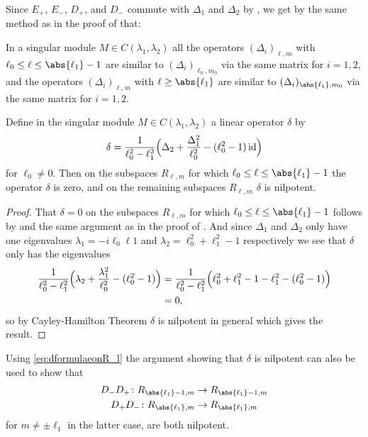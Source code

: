 Since $E_+$, $E_-$, $D_+$, and $D_-$ commute with $\Delta_1$ and $\Delta_2$ by , we get by the same method as in the proof of  that:

\begin{lemma}\label{lem:singmodDeltasimilar}
  In a singular module $M\in C(\lambda_1,\lambda_2)$ all the operators $(\Delta_i)_{\ell,m}$ with $\ell_0\leq \ell\leq \abs{\ell_1}-1$ are similar to $(\Delta_i)_{\ell_0,m_0}$ via the same matrix for $i=1,2$, and the operators $(\Delta_i)_{\ell,m}$ with $\ell\geq \abs{\ell_1}$ are similar to $(\Delta_i)_{\abs{\ell_1},m_0}$ via the same matrix for $i=1,2$.
\end{lemma}

\begin{lemma}\label{lem:Deltarelsing}
  Define in the singular module $M\in C(\lambda_1,\lambda_2)$ a linear operator $\delta$ by
  \begin{align}
    \delta = \dfrac{1}{\ell_0^2-\ell_1^2}\Bigl( \Delta_2 + \dfrac{\Delta_1^2}{\ell_0^2} - (\ell_0^2-1)\operatorname{id} \Bigr)
  \end{align}
  for $\ell_0\neq 0$. Then on the subspaces $R_{\ell,m}$ for which $\ell_0\leq \ell\leq \abs{\ell_1}-1$ the operator $\delta$ is zero, and on the remaining subspaces $R_{\ell,m}$ $\delta$ is nilpotent.
\end{lemma}
\begin{proof}
  That $\delta=0$ on the subspaces $R_{\ell,m}$ for which $\ell_0\leq \ell\leq \abs{\ell_1}-1$ follows by  and the same argument as in the proof of . And since $\Delta_1$ and $\Delta_2$ only have one eigenvalues $\lambda_1=-i\ell_0\ell1$ and $\lambda_2=\ell_0^2+\ell_1^2-1$ respectively we see that $\delta$ only has the eigenvalues
  \begin{align*}
    \dfrac{1}{\ell_0^2-\ell_1^2}\Bigl( \lambda_2 + \dfrac{\lambda_1^2}{\ell_0^2} - (\ell_0^2-1) \Bigr) &=\dfrac{1}{\ell_0^2-\ell_1^2}\Bigl( \ell_0^2+\ell_1^2-1 - \ell_1^2 - (\ell_0^2-1) \Bigr) \\
    &=0,
  \end{align*}
  so by Cayley-Hamilton Theorem $\delta$ is nilpotent in general which gives the result.
\end{proof}

\begin{remark}\label{rem:D+D-nilpotent}
  Using \cref{eq:dformulaeonR_l} the argument showing that $\delta$ is nilpotent can also be used to show that
  \begin{align*}
    D_-D_+\colon R_{\abs{\ell_1}-1,m} &\to R_{\abs{\ell_1}-1,m} \\
    D_+D_-\colon R_{\abs{\ell_1},m} &\to R_{\abs{\ell_1},m}
  \end{align*}
  for $m\neq \pm \ell_1$ in the latter case, are both nilpotent.
\end{remark}

